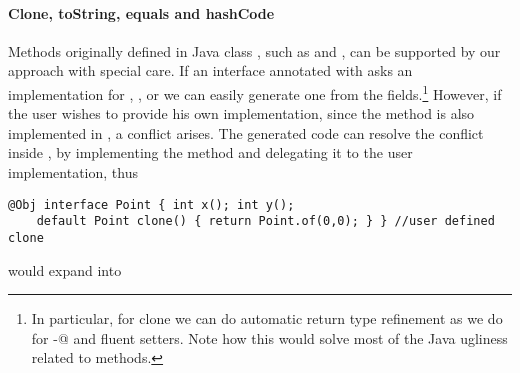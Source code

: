 \begin{comment}
\subsection{Class Invariants in ClassLess Java}
Since objects are created by automatically generated methods, another limitation
of our current approach is that there is no place where the user can dynamically
check for class invariants. In Java often we see code like
\begin{lstlisting}
class Point{ int x; int y;
  Point(int x; int y){this.x=x;this.y=y; assert this.checkInvariant();}
  private boolean checkInvariant(){... x>0,y>0...}
}
\end{lstlisting}

We are considering an extension of our annotation where
default methods with the special name \Q@checkInvariant()@ will be called inside the \Q@of@ methods.
If multiple interfaces are implemented, and more then one offers
\Q@checkInvariant()@,  a composed implementation could be automatically generated, composing by \Q@&&@ the various competing implementations.
\end{comment}

\paragraph{Clone, toString, equals and hashCode}
Methods originally defined in Java class \Q@Object@, such as \Q@clone@ and
\Q@toString@, can be supported by our approach with special care. If an
interface annotated with \mixin asks an implementation for \Q@clone@,
\Q@toString@, \Q@equals@ or \Q@hashCode@ we can easily generate one from the
fields.\footnote{In particular, for clone we can do automatic return type
  refinement as we do for \Q@with-@ and fluent setters. Note how this would
  solve most of the Java ugliness related to \Q@clone@ methods.}  However, if
the user wishes to provide his own implementation, since the method is also
implemented in \Q@Object@, a conflict arises. The generated code can resolve the
conflict inside \Q@of@, by implementing the method and delegating it to the user
implementation, thus

\begin{lstlisting}
@Obj interface Point { int x(); int y();
    default Point clone() { return Point.of(0,0); } } //user defined clone
\end{lstlisting}
would expand into

